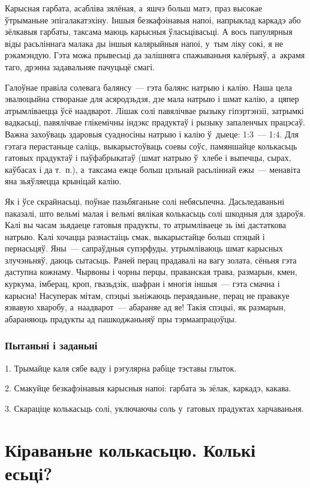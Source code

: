 Карысная гарбата, асабліва зялёная, а~яшчэ больш матэ, праз высокае ўтрыманьне эпігалакатэхіну. Іншыя безкафэінавыя напоі, напрыклад каркадэ або зёлкавыя гарбаты, таксама маюць карысныя ўласьцівасьці. А вось папулярныя віды расьліннага малака ды іншыя калярыйныя напоі, у~тым ліку сокі, я не рэкамэндую. Гэта можа прывесьці да залішняга спажываньня калёрыяў, а~акрамя таго, дрэнна задавальняе пачуцьцё смагі.

Галоўнае правіла солевага балянсу~--- гэта балянс натрыю і калію. Наша цела эвалюцыйна створанае для асяродзьдзя, дзе мала натрыю і шмат калію, а~цяпер атрымліваецца ўсё наадварот. Лішак солі павялічвае рызыку гіпэртэнзіі, затрымкі вадкасьці, павялічвае глікемічны індэкс прадуктаў і рызыку запаленчых працэсаў. Важна захоўваць здаровыя суадносіны натрыю і калію ў~дыеце: 1:3~--- 1:4. Для гэтага перастаньце саліць, выкарыстоўваць соевы соўс, памяншайце колькасьць гатовых прадуктаў і паўфабрыкатаў (шмат натрыю ў~хлебе і выпечцы, сырах, каўбасах і да т.~п.), а~таксама ежце больш цэльнай расьліннай ежы~--- менавіта яна зьяўляецца крыніцай калію.

Як і ўсе скрайнасьці, поўнае пазьбяганьне солі небясьпечна. Дасьледаваньні паказалі, што вельмі малая і вельмі вялікая колькасьць солі шкодныя для здароўя. Калі вы часам зьядаеце гатовыя прадукты, то атрымліваеце зь імі дастаткова натрыю. Калі хочацца разнастаіць смак, выкарыстайце больш спэцый і пернасьцяў. Яны~--- сапраўдныя супэрфуды, утрымліваюць шмат карысных злучэньняў, даюць сытасьць. Раней перац прадавалі на вагу золата, сёньня гэта даступна кожнаму. Чырвоны і чорны перцы, праванская трава, размарын, кмен, куркума, імберац, кроп, гвазьдзік, шафран і многія іншыя~--- гэта смачна і карысна! Насуперак мітам, спэцыі зьніжаюць пераяданьне, перац не правакуе язвавую хваробу, а~наадварот~--- абараняе ад яе! Такія спэцыі, як размарын, абараняюць прадукты ад пашкоджаньняў пры тэрмаапрацоўцы.

\subsubsection{Пытаньні і заданьні}

1. Трымайце каля сябе ваду і рэгулярна рабіце тэставы глыток.

2. Смакуйце безкафэінавыя карысныя напоі: гарбата зь зёлак, каркадэ, какава.

3. Скараціце колькасьць солі, уключаючы соль у~гатовых прадуктах харчаваньня.


\section{Кіраваньне колькасьцю. Колькі есьці?}

